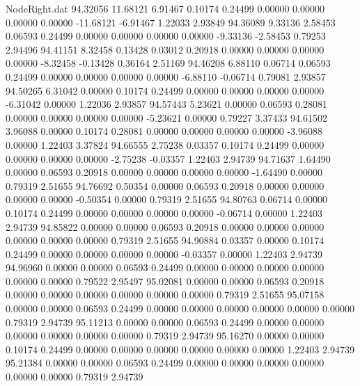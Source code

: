\begin{filecontents}{NodeRight.dat}
  94.32056   11.68121    6.91467     0.10174    0.24499    0.00000    0.00000    0.00000    0.00000  -11.68121   -6.91467    1.22033    2.93849
  94.36089    9.33136    2.58453     0.06593    0.24499    0.00000    0.00000    0.00000    0.00000   -9.33136   -2.58453    0.79253    2.94496
  94.41151    8.32458    0.13428     0.03012    0.20918    0.00000    0.00000    0.00000    0.00000   -8.32458   -0.13428    0.36164    2.51169
  94.46208    6.88110    0.06714     0.06593    0.24499    0.00000    0.00000    0.00000    0.00000   -6.88110   -0.06714    0.79081    2.93857
  94.50265    6.31042    0.00000     0.10174    0.24499    0.00000    0.00000    0.00000    0.00000   -6.31042    0.00000    1.22036    2.93857
  94.57443    5.23621    0.00000     0.06593    0.28081    0.00000    0.00000    0.00000    0.00000   -5.23621    0.00000    0.79227    3.37433
  94.61502    3.96088    0.00000     0.10174    0.28081    0.00000    0.00000    0.00000    0.00000   -3.96088    0.00000    1.22403    3.37824
  94.66555    2.75238    0.03357     0.10174    0.24499    0.00000    0.00000    0.00000    0.00000   -2.75238   -0.03357    1.22403    2.94739
  94.71637    1.64490    0.00000     0.06593    0.20918    0.00000    0.00000    0.00000    0.00000   -1.64490    0.00000    0.79319    2.51655
  94.76692    0.50354    0.00000     0.06593    0.20918    0.00000    0.00000    0.00000    0.00000   -0.50354    0.00000    0.79319    2.51655
  94.80763    0.06714    0.00000     0.10174    0.24499    0.00000    0.00000    0.00000    0.00000   -0.06714    0.00000    1.22403    2.94739
  94.85822    0.00000    0.00000     0.06593    0.20918    0.00000    0.00000    0.00000    0.00000    0.00000    0.00000    0.79319    2.51655
  94.90884    0.03357    0.00000     0.10174    0.24499    0.00000    0.00000    0.00000    0.00000   -0.03357    0.00000    1.22403    2.94739
  94.96960    0.00000    0.00000     0.06593    0.24499    0.00000    0.00000    0.00000    0.00000    0.00000    0.00000    0.79522    2.95497
  95.02081    0.00000    0.00000     0.06593    0.20918    0.00000    0.00000    0.00000    0.00000    0.00000    0.00000    0.79319    2.51655
  95.07158    0.00000    0.00000     0.06593    0.24499    0.00000    0.00000    0.00000    0.00000    0.00000    0.00000    0.79319    2.94739
  95.11213    0.00000    0.00000     0.06593    0.24499    0.00000    0.00000    0.00000    0.00000    0.00000    0.00000    0.79319    2.94739
  95.16270    0.00000    0.00000     0.10174    0.24499    0.00000    0.00000    0.00000    0.00000    0.00000    0.00000    1.22403    2.94739
  95.21384    0.00000    0.00000     0.06593    0.24499    0.00000    0.00000    0.00000    0.00000    0.00000    0.00000    0.79319    2.94739

\end{filecontents}
